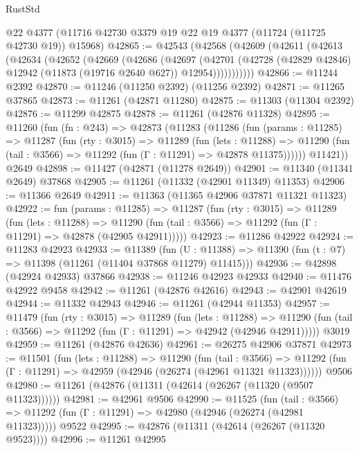 \begin{lexlean}{RustStd}
\begin{coremodule}
    @22
    @4377
    (@11716 @42730 @3379 @19 @22 @19 @4377 (@11724 (@11725 @42730 @19)) @15968)
@42865 := @42543
    (@42568
      (@42609
        (@42611
          (@42613
            (@42634
              (@42652
                (@42669
                  (@42686
                    (@42697
                      (@42701
                        (@42728
                          (@42829 @42846)
                          @12942
                          (@11873 (@19716 @2640 @627))
                          @12954)))))))))))
@42866 := @11244 @2392
@42870 := @11246 (@11250 @2392) (@11256 @2392)
@42871 := @11265 @37865
@42873 := @11261 (@42871 @11280)
@42875 := @11303 (@11304 @2392)
@42876 := @11299 @42875
@42878 := @11261 (@42876 @11328)
@42895 := @11260
    (fun (fn : @243) =>
    @42873
      (@11283
        (@11286
          (fun (params : @11285) =>
          @11287
            (fun (rty : @3015) =>
            @11289
              (fun (lets : @11288) =>
              @11290 (fun (tail : @3566) => @11292 (fun (Γ : @11291) => @42878 @11375))))))
        @11421))
    @2649
@42898 := @11427 (@42871 (@11278 @2649))
@42901 := @11340 (@11341 @2649) @37868
@42905 := @11261 (@11332 (@42901 @11349) @11353)
@42906 := @11366 @2649
@42911 := @11363 (@11365 @42906 @37871 @11321 @11323)
@42922 := fun (params : @11285) =>
  @11287
    (fun (rty : @3015) =>
    @11289
      (fun (lets : @11288) =>
      @11290 (fun (tail : @3566) => @11292 (fun (Γ : @11291) => @42878 (@42905 @42911)))))
@42923 := @11286 @42922
@42924 := @11283 @42923
@42933 := @11389
    (fun (U : @11388) => @11390 (fun (t : @7) => @11398 (@11261 (@11404 @37868 @11279) @11415)))
@42936 := @42898 (@42924 @42933) @37866
@42938 := @11246 @42923 @42933
@42940 := @11476 @42922 @9458
@42942 := @11261 (@42876 @42616)
@42943 := @42901 @42619
@42944 := @11332 @42943
@42946 := @11261 (@42944 @11353)
@42957 := @11479
    (fun (rty : @3015) =>
    @11289
      (fun (lets : @11288) =>
      @11290 (fun (tail : @3566) => @11292 (fun (Γ : @11291) => @42942 (@42946 @42911)))))
    @3019
@42959 := @11261 (@42876 @42636)
@42961 := @26275 @42906 @37871
@42973 := @11501
    (fun (lets : @11288) =>
    @11290
      (fun (tail : @3566) =>
      @11292 (fun (Γ : @11291) => @42959 (@42946 (@26274 (@42961 @11321 @11323))))))
    @9506
@42980 := @11261 (@42876 (@11311 (@42614 (@26267 (@11320 (@9507 @11323))))))
@42981 := @42961 @9506
@42990 := @11525
    (fun (tail : @3566) => @11292 (fun (Γ : @11291) => @42980 (@42946 (@26274 (@42981 @11323)))))
    @9522
@42995 := @42876 (@11311 (@42614 (@26267 (@11320 @9523))))
@42996 := @11261 @42995

\end{coremodule}
\end{lexlean}
